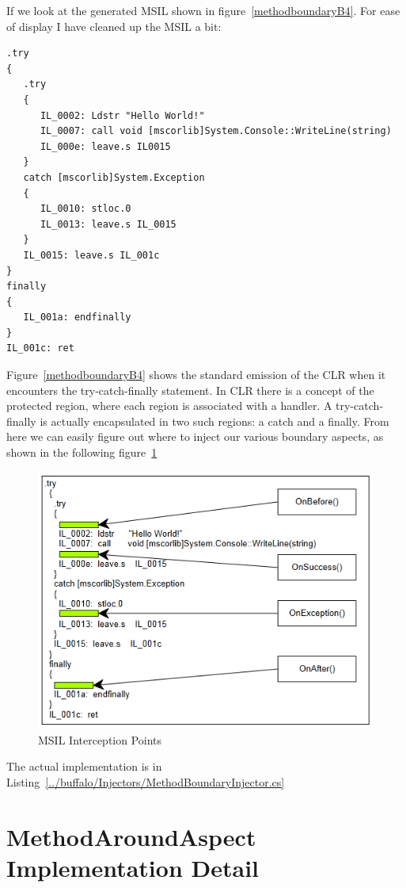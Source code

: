 If we look at the generated MSIL shown in figure~\ref{methodboundaryB4}. For ease of display I have cleaned up the MSIL a bit:

\begin{lstlisting}[caption={MSIL generated for sample C\# function}, label=methodboundaryB4]
.try
{
   .try
   {
      IL_0002: Ldstr "Hello World!"
      IL_0007: call void [mscorlib]System.Console::WriteLine(string)
      IL_000e: leave.s IL0015
   }
   catch [mscorlib]System.Exception
   {
      IL_0010: stloc.0
      IL_0013: leave.s IL_0015
   }
   IL_0015: leave.s IL_001c
}
finally
{
   IL_001a: endfinally
}
IL_001c: ret
\end{lstlisting}

Figure~\ref{methodboundaryB4} shows the standard emission of the CLR when it encounters the try-catch-finally statement. In CLR there is a concept of the protected region, where each region is associated with a handler. A try-catch-finally is actually encapsulated in two such regions: a catch and a finally. From here we can easily figure out where to inject our various boundary aspects, as shown in the following figure~\ref{methodboundary02}

\begin{figure}[H]
  \includegraphics[scale=1.0]{MethodBoundaryOverview.PNG}
  \centering
  \caption{MSIL Interception Points\label{methodboundary02}}
\end{figure}

The actual implementation is in Listing~\ref{../buffalo/Injectors/MethodBoundaryInjector.cs}

\section{MethodAroundAspect Implementation Detail}

